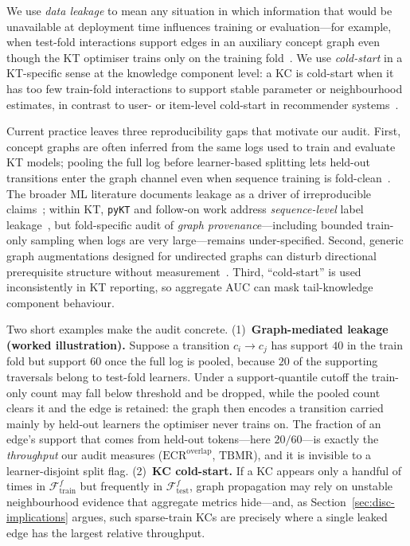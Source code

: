 \documentclass[pdflatex,sn-mathphys-num]{sn-jnl}
\newcommand{\KC}{knowledge component}
\begin{document}
We use \emph{data leakage} to mean any situation in which information
that would be unavailable at deployment time influences training or
evaluation---for example, when test-fold interactions support edges in
an auxiliary concept graph even though the KT optimiser trains only on
the training fold~\cite{kaufman2012leakage,kapoor2023leakage}. We use
\emph{cold-start} in a KT-specific sense at the \KC{} level: a KC is
cold-start when it has too few train-fold interactions to support stable
parameter or neighbourhood estimates, in contrast to user- or item-level
cold-start in recommender systems~\cite{schein2002coldstart}.

Current practice leaves three reproducibility gaps that motivate our
audit. First, concept graphs are often inferred from the same logs used
to train and evaluate KT models; pooling the full log before
learner-based splitting lets held-out transitions enter the graph
channel even when sequence training is fold-clean~\cite{nakagawa2019gkt,tong2020skt,liu2022pykt}.
The broader ML literature documents leakage as a driver of irreproducible
claims~\cite{kaufman2012leakage,kapoor2023leakage}; within KT,
\texttt{pyKT} and follow-on work address \emph{sequence-level} label
leakage~\cite{liu2022pykt,badran2024labelleakage}, but fold-specific
audit of \emph{graph provenance}---including bounded train-only sampling
when logs are very large---remains under-specified. Second, generic graph
augmentations designed for undirected graphs can disturb directional
prerequisite structure without measurement~\cite{you2020graphcl,zhu2021gca}.
Third, ``cold-start'' is used inconsistently in KT reporting, so
aggregate AUC can mask tail-\KC{} behaviour.

Two short examples make the audit concrete. (1)~\textbf{Graph-mediated
leakage (worked illustration).} Suppose a transition $c_i\!\to\!c_j$ has
support $40$ in the train fold but support $60$ once the full log is pooled,
because $20$ of the supporting traversals belong to test-fold learners. Under
a support-quantile cutoff the train-only count may fall below threshold and be
dropped, while the pooled count clears it and the edge is retained: the graph
then encodes a transition carried mainly by held-out learners the optimiser
never trains on. The fraction of an edge's support that comes from held-out
tokens---here $20/60$---is exactly the \emph{throughput} our audit measures
($\mathrm{ECR}^{\mathrm{overlap}}$, $\mathrm{TBMR}$), and it is invisible to a
learner-disjoint split flag. (2)~\textbf{KC cold-start.} If a KC appears only a
handful of times in $\mathcal{F}_{\text{train}}^f$ but frequently in
$\mathcal{F}_{\text{test}}^f$, graph propagation may rely on unstable
neighbourhood evidence that aggregate metrics hide---and, as
Section~\ref{sec:disc-implications} argues, such sparse-train KCs are precisely
where a single leaked edge has the largest relative throughput.
\end{document}
